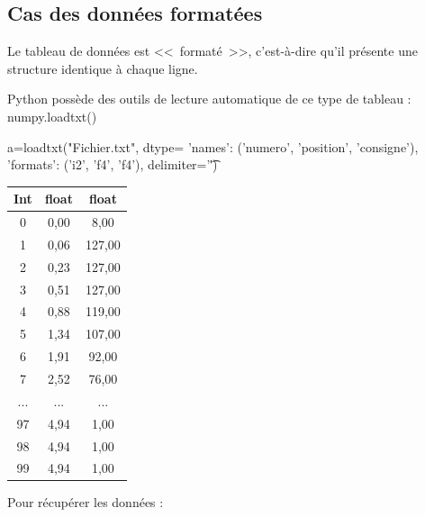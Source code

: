 \documentclass[10pt,fleqn]{article} %
\begin{document}
\begin{minipage}[c]{.69\linewidth}

\subsection{Cas des données formatées}
Le tableau de données est <<~formaté~>>, c'est-à-dire qu'il présente une structure identique à chaque ligne.

Python possède des outils de lecture automatique de ce type de tableau : numpy.loadtxt()

\begin{py}
\begin{python}[h]
a=loadtxt("Fichier.txt",
		dtype={
			'names': ('numero', 'position', 'consigne'),
			'formats': ('i2', 'f4', 'f4')},
		delimiter='\t')
\end{python}
\end{py}

\end{minipage} \hfill
\begin{minipage}[c]{.29\linewidth}
\begin{tabular}{ccc}
\hline
Int	&float	&	float\\
\hline
0	&0,00		&8,00\\
1	&0,06	&	127,00\\
2&	0,23	&	127,00\\
3&	0,51	&	127,00\\
4&	0,88	&	119,00\\
5&	1,34	&	107,00\\
6&	1,91	&	92,00\\
7&	2,52	&	76,00\\
... &...  &...  \\
97&	4,94	&	1,00\\
98&	4,94	&	1,00\\
99&	4,94	&	1,00\\
\hline
\end{tabular}


\end{minipage}



Pour récupérer les données :
\begin{py}
\end{py}
\end{document}
